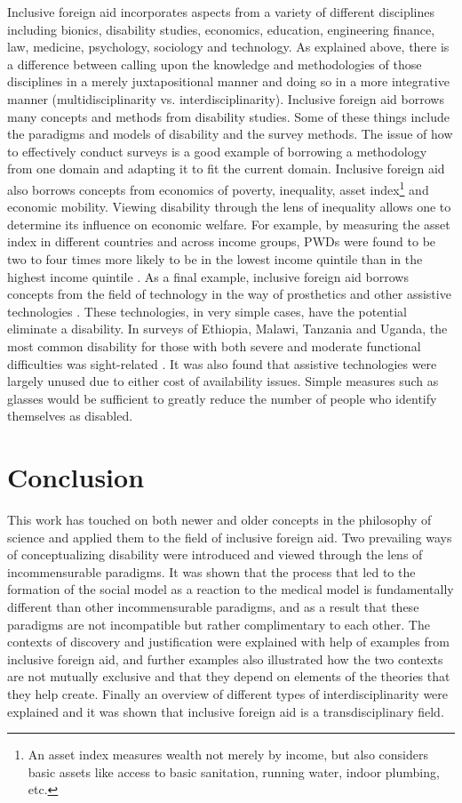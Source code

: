 \documentclass[a4paper]{article}
\begin{document}
Inclusive foreign aid incorporates aspects from a variety of different
disciplines including bionics, disability studies, economics, education,
engineering finance, law, medicine, psychology, sociology and technology. As
explained above, there is a difference between calling upon the knowledge and
methodologies of those disciplines in a merely juxtapositional manner and
doing so in a more integrative manner (multidisciplinarity vs.
interdisciplinarity). Inclusive foreign aid borrows many concepts and methods
from disability studies. Some of these things include the paradigms and models
of disability and the survey methods. The issue of how to effectively conduct
surveys is a good example of borrowing a methodology from one domain and
adapting it to fit the current domain. Inclusive foreign aid also borrows
concepts from economics of poverty, inequality, asset index\footnote{An asset
    index measures wealth not merely by income, but also considers basic
assets like access to basic sanitation, running water, indoor plumbing, etc.}
and economic mobility. Viewing disability through the lens of inequality
allows one to determine its influence on economic welfare. For example, by
measuring the asset index in different countries and across income groups,
PWDs were found to be two to four times more likely to be in the lowest income
quintile than in the highest income quintile \citep{mitra2018disability}. As a
final example, inclusive foreign aid borrows concepts from the field of
technology in the way of prosthetics and other assistive technologies
\citep{roulstone2016disability}. These technologies, in very simple cases,
have the potential eliminate a disability. In surveys of Ethiopia, Malawi,
Tanzania and Uganda, the most common disability for those with both severe and
moderate functional difficulties was sight-related
\citep{mitra2018disability}. It was also found that assistive technologies
were largely unused due to either cost of availability issues. Simple measures
such as glasses would be sufficient to greatly reduce the number of people who
identify themselves as disabled.

\newpage
\section{Conclusion}

This work has touched on both newer and older concepts in the philosophy of
science and applied them to the field of inclusive foreign aid. Two prevailing
ways of conceptualizing disability were introduced and viewed through the lens
of incommensurable paradigms. It was shown that the process that led to the
formation of the social model as a reaction to the medical model is
fundamentally different than other incommensurable paradigms, and as a result
that these paradigms are not incompatible but rather complimentary to each
other. The contexts of discovery and justification were explained with help of
examples from inclusive foreign aid, and further examples also illustrated how
the two contexts are not mutually exclusive and that they depend on elements
of the theories that they help create. Finally an overview of different types
of interdisciplinarity were explained and it was shown that inclusive foreign
aid is a transdisciplinary field.
\end{document}
